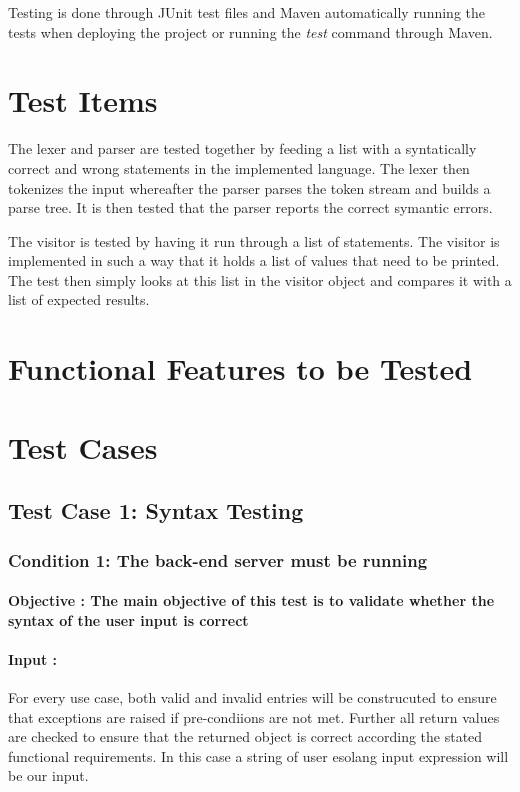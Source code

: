 \documentclass[english]{article}
\begin{document}
			Testing is done through JUnit test files and Maven automatically running the tests when deploying the project or running the \textit{test} command through Maven.
		\section{Test Items}
			The lexer and parser are tested together by feeding a list with a syntatically correct and wrong statements in the implemented language. The lexer then tokenizes the input whereafter the parser parses the token stream and builds a parse tree. It is then tested that the parser reports the correct symantic errors.
			
			The visitor is tested by having it run through a list of statements. The visitor is implemented in such a way that it holds a list of values that need to be printed. The test then simply looks at this list in the visitor object and compares it with a list of expected results.
		
	\section{Functional Features to be Tested}
		\section{Test Cases}

			\subsection{Test Case 1: Syntax Testing}
			
			\subsubsection{Condition 1: The back-end server must be running }
			\paragraph{Objective : The main objective of this test is to validate whether the syntax of the user input is correct }
			\paragraph{Input :} For every use case, both valid and invalid entries will be construcuted to ensure that exceptions are raised if pre-condiions are not met. Further all return values are checked to ensure that the returned object is correct according the stated
			functional requirements. In this case a string of user  esolang input expression will be our input.
			
\end{document}
